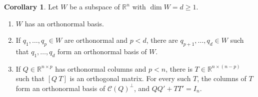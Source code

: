\documentclass[12pt]{article}
\newcommand{\R}{\mathbb R}
\theoremstyle{definition}
\newtheorem{corollary}[theorem]{Corollary}
\begin{document}
\begin{corollary}\label{r6-cor-onb}
Let \(W\) be a subspace of \(\R^n\) with \(\dim W=d\geqslant1\).
\begin{enumerate}
\item \(W\) has an orthonormal basis.
\item If \(q_1,\dots,q_p\in W\) are orthonormal and \(p<d\), there are \(q_{p+1},\dots,q_d\in W\) such that
\(q_1,\dots,q_d\) form an orthonormal basis of \(W\).
\item If \(Q\in\R^{n\times p}\) has orthonormal columns and \(p<n\), there is \(T\in\R^{n\times(n-p)}\) such that
\([Q\ T]\) is an orthogonal matrix. For every such \(T\), the columns of \(T\) form an orthonormal basis of
\(\mathcal C(Q)^\perp\), and \(QQ'+TT'=I_n\).
\end{enumerate}
\end{corollary}
\end{document}
